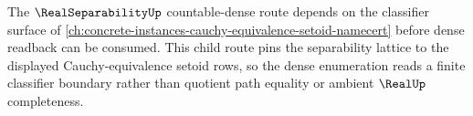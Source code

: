The $\RealSeparabilityUp$ countable-dense route depends on the classifier surface of \autoref{ch:concrete-instances-cauchy-equivalence-setoid-namecert} before dense readback can be consumed. This child route pins the separability lattice to the displayed Cauchy-equivalence setoid rows, so the dense enumeration reads a finite classifier boundary rather than quotient path equality or ambient $\RealUp$ completeness.
